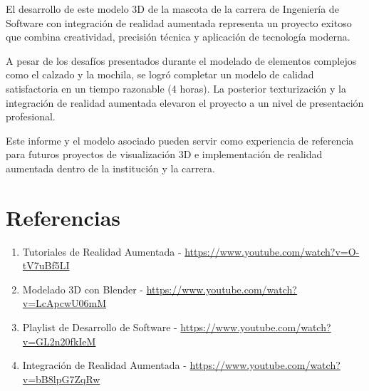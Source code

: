 \documentclass[12pt,a4paper]{article}
\begin{document}
El desarrollo de este modelo 3D de la mascota de la carrera de Ingeniería de Software con integración de realidad aumentada representa un proyecto exitoso que combina creatividad, precisión técnica y aplicación de tecnología moderna.

A pesar de los desafíos presentados durante el modelado de elementos complejos como el calzado y la mochila, se logró completar un modelo de calidad satisfactoria en un tiempo razonable (4 horas). La posterior texturización y la integración de realidad aumentada elevaron el proyecto a un nivel de presentación profesional.

Este informe y el modelo asociado pueden servir como experiencia de referencia para futuros proyectos de visualización 3D e implementación de realidad aumentada dentro de la institución y la carrera.

\section{Referencias}

\begin{enumerate}
    \item Tutoriales de Realidad Aumentada - \href{https://www.youtube.com/watch?v=O-tV7uBf5LI&t=830s}{https://www.youtube.com/watch?v=O-tV7uBf5LI}
    
    \item Modelado 3D con Blender - \href{https://www.youtube.com/watch?v=LcApcwU06mM}{https://www.youtube.com/watch?v=LcApcwU06mM}
    
    \item Playlist de Desarrollo de Software - \href{https://www.youtube.com/watch?v=GL2n20fkIeM&list=PLuSRwfbdkuG_bkepzBkCxYFopungXtsPJ}{https://www.youtube.com/watch?v=GL2n20fkIeM}
    
    \item Integración de Realidad Aumentada - \href{https://www.youtube.com/watch?v=bB8lpG7ZqRw}{https://www.youtube.com/watch?v=bB8lpG7ZqRw}
\end{enumerate}
\end{document}
